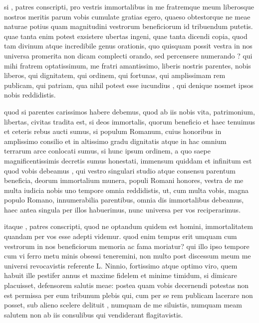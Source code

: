 
 si , patres conscripti, pro vestris immortalibus in me fratremque meum liberosque nostros meritis parum vobis cumulate gratias egero, quaeso obtestorque ne meae naturae potius quam magnitudini vestrorum beneficiorum id tribuendum putetis. quae tanta enim potest exsistere ubertas ingeni, quae tanta dicendi copia, quod tam divinum atque incredibile genus orationis, quo quisquam possit vestra in nos universa promerita non dicam complecti orando, sed percensere numerando ? qui mihi fratrem optatissimum, me fratri amantissimo, liberis nostris parentes, nobis liberos, qui dignitatem, qui ordinem, qui fortunas, qui amplissimam rem publicam, qui patriam, qua nihil potest esse iucundius , qui denique nosmet ipsos nobis reddidistis.

 quod si parentes carissimos habere debemus, quod ab iis nobis vita, patrimonium, libertas, civitas tradita est, si deos immortalis, quorum beneficio et haec tenuimus et ceteris rebus aucti sumus, si populum Romanum, cuius honoribus in amplissimo consilio et in altissimo gradu dignitatis atque in hac omnium terrarum arce conlocati sumus, si hunc ipsum ordinem, a quo saepe magnificentissimis decretis sumus honestati, immensum quiddam et infinitum est quod vobis debeamus , qui vestro singulari studio atque consensu parentum beneficia, deorum immortalium munera, populi Romani honores, vestra de me multa iudicia nobis uno tempore omnia reddidistis, ut, cum multa vobis, magna populo Romano, innumerabilia parentibus, omnia dis immortalibus debeamus, haec antea singula per illos habuerimus, nunc universa per vos reciperarimus.

 itaque , patres conscripti, quod ne optandum quidem est homini, immortalitatem quandam per vos esse adepti videmur. quod enim tempus erit umquam cum vestrorum in nos beneficiorum memoria ac fama moriatur? qui illo ipso tempore cum vi ferro metu minis obsessi teneremini, non multo post discessum meum me universi revocavistis referente L. Ninnio, fortissimo atque optimo viro, quem habuit ille pestifer annus et maxime fidelem et minime timidum, si dimicare placuisset, defensorem salutis meae: postea quam vobis decernendi potestas non est permissa per eum tribunum plebis qui, cum per se rem publicam lacerare non posset, sub alieno scelere delituit , numquam de me siluistis, numquam meam salutem non ab iis consulibus qui vendiderant flagitavistis.

